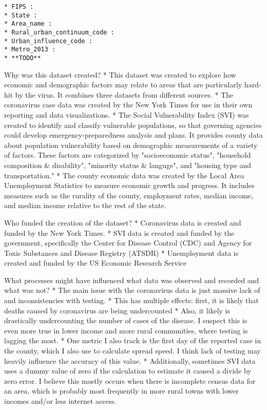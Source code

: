\documentclass[11pt]{article}
\begin{document}
\begin{verbatim}
* FIPS :
* State :
* Area_name :
* Rural_urban_continuum_code :
* Urban_influence_code :
* Metro_2013 : 
* **TODO**
\end{verbatim}

Why was this dataset created? * This dataset was created to explore how
economic and demographic factors may relate to areas that are
particularly hard-hit by the virus. It combines three datasets from
different sources. * The coronavirus case data was created by the New
York Times for use in their own reporting and data visualizations. * The
Social Vulnerability Index (SVI) was created to identify and classify
vulnerable populations, so that governing agencies could develop
emergency-preparedness analysis and plans. It provides county data about
population vulnerability based on demographic measurements of a variety
of factors. These factors are categorized by "socioeconomic status",
"household composition \& disability", "minority status \& languge", and
"housing type and transportation." * The county economic data was
created by the Local Area Unemployment Statistics to measure economic
growth and progress. It includes measures such as the rurality of the
county, employment rates, median income, and median income relative to
the rest of the state.

Who funded the creation of the dataset? * Coronavirus data is created
and funded by the New York Times. * SVI data is created and funded by
the government, specifically the Center for Disease Control (CDC) and
Agency for Toxic Substances and Disease Registry (ATSDR) * Unemployment
data is created and funded by the US Economic Research Service

What processes might have influenced what data was observed and recorded
and what was not? * The main issue with the coronavirus data is just
massive lack of and inconsistencies with testing. * This has multiple
effects: first, it is likely that deaths caused by coronavirus are being
undercounted * Also, it likely is drastically undercounting the number
of cases of the disease. I suspect this is even more true in lower
income and more rural communities, where testing is lagging the most. *
One metric I also track is the first day of the reported case in the
county, which I also use to calculate spread speed. I think lack of
testing may heavily influence the accuracy of this value. *
Additionally, sometimes SVI data uses a dummy value of zero if the
calculation to estimate it caused a divide by zero error. I believe this
mostly occurs when there is incomplete census data for an area, which is
probably most frequently in more rural towns with lower incomes and/or
less internet access.
\end{document}
